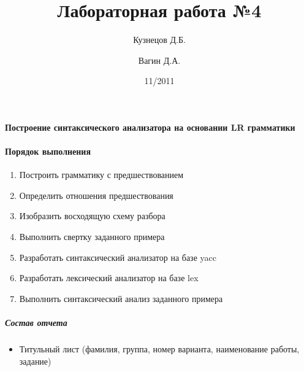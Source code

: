 \documentclass[a4paper,12pt]{article}
\title{Лабораторная работа №4}
\author{Кузнецов Д.Б.\and Вагин Д.А.}
\date{11/2011}
\begin{document}
\paragraph{Построение синтаксического анализатора на основании LR грамматики}

\paragraph{Порядок выполнения}
\begin{enumerate}
	\item Построить грамматику с предшествованием
	\item Определить отношения предшествования
	\item Изобразить восходящую схему разбора
	\item Выполнить свертку заданного примера
	\item Разработать синтаксический анализатор на базе yacc
	\item Разработать лексический анализатор на базе lex
	\item Выполнить синтаксический анализ заданного примера
\end{enumerate}

\subparagraph{Состав отчета}
\begin{itemize}
	\item Титульный лист (фамилия, группа, номер варианта, наименование работы, задание)
\end{itemize}
\end{document}
